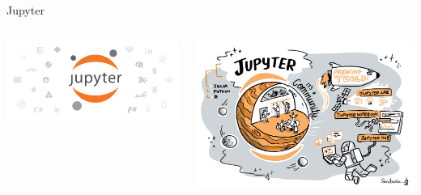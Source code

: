 \documentclass[bigger,unknownkeysallowed,aspectratio=169,red,colorblocks]{beamer}
\begin{document}
\begin{frame}[label={sec:org194be2e}]{Jupyter}
\begin{columns}
\begin{column}{0.4\columnwidth}

\begin{center}
\includegraphics[width=.9\linewidth]{images/A_block/2020-09-20_04-38-32_screenshot.png}
\end{center}
\end{column}

\begin{column}{0.6\columnwidth}
\begin{center}
\includegraphics[width=.9\linewidth]{images/turingWay/Jupyter.jpg}
\end{center}
\end{column}
\end{columns}
\end{frame}
\end{document}
